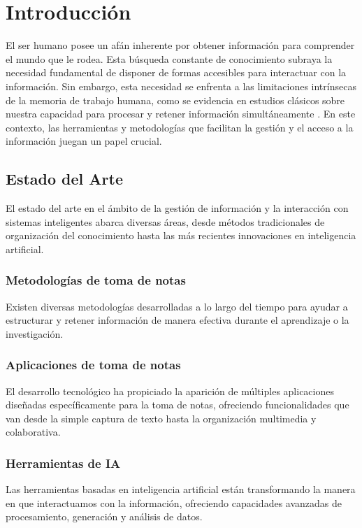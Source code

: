 \chapter{Introducción}\label{chapter:introduction}

El ser humano posee un afán inherente por obtener información para comprender el mundo que le rodea. Esta búsqueda constante de conocimiento subraya la necesidad fundamental de disponer de formas accesibles para interactuar con la información. Sin embargo, esta necesidad se enfrenta a las limitaciones intrínsecas de la memoria de trabajo humana, como se evidencia en estudios clásicos sobre nuestra capacidad para procesar y retener información simultáneamente \citep{millerMagicalNumberSeven1956}. En este contexto, las herramientas y metodologías que facilitan la gestión y el acceso a la información juegan un papel crucial.

\section{Estado del Arte}\label{sec:state_of_the_art}
El estado del arte en el ámbito de la gestión de información y la interacción con sistemas inteligentes abarca diversas áreas, desde métodos tradicionales de organización del conocimiento hasta las más recientes innovaciones en inteligencia artificial.

\subsection{Metodologías de toma de notas}\label{sec:note_taking_methodologies}
Existen diversas metodologías desarrolladas a lo largo del tiempo para ayudar a estructurar y retener información de manera efectiva durante el aprendizaje o la investigación. %

\subsection{Aplicaciones de toma de notas}\label{sec:note_taking_apps}
El desarrollo tecnológico ha propiciado la aparición de múltiples aplicaciones diseñadas específicamente para la toma de notas, ofreciendo funcionalidades que van desde la simple captura de texto hasta la organización multimedia y colaborativa. %

\subsection{Herramientas de IA}\label{sec:ai_tools}
Las herramientas basadas en inteligencia artificial están transformando la manera en que interactuamos con la información, ofreciendo capacidades avanzadas de procesamiento, generación y análisis de datos. %


